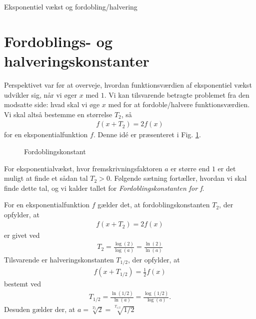 \begin{center}
\Huge
Eksponentiel vækst og fordobling/halvering
\end{center}
\section*{Fordoblings- og halveringskonstanter}
Perspektivet var før at overveje, hvordan funktionsværdien af eksponentiel vækst udvikler sig, når vi øger $x$ med $1$. Vi kan tilsvarende betragte problemet fra den modsatte side: hvad skal vi øge $x$ med for at fordoble/halvere funktionsværdien. Vi skal altså bestemme en størrelse $T_2$, så 
\begin{align*}
f(x+T_2) = 2f(x)
\end{align*}
for en eksponentialfunktion $f$. Denne idé er præsenteret i Fig. \ref{fig:Fordobling}. 
\begin{figure}[H]
\center
{}
\caption{Fordoblingskonstant}
\label{fig:Fordobling}

\end{figure}
For eksponentialvækst, hvor fremskrivningsfaktoren $a$ er større end $1$ er det muligt at finde et sådan tal $T_2>0$. Følgende sætning fortæller, hvordan vi skal finde dette tal, og vi kalder tallet for \textit{Fordoblingskonstanten for f}.
\begin{setn}
For en eksponentialfunktion $f$ gælder det, at fordoblingskonstanten $T_2$, der opfylder, at
\begin{align*}
f(x+T_2) = 2f(x)
\end{align*}
er givet ved 
\begin{align*}
T_2 = \frac{\log(2)}{\log(a)} = \frac{\ln(2)}{\ln(a)}
\end{align*}
Tilsvarende er halveringskonstanten $T_{1/2}$, der opfylder, at 
\begin{align*}
f(x+T_{1/2}) = \frac{1}{2}f(x)
\end{align*}
bestemt ved
\begin{align*}
T_{1/2} = \frac{\ln(1/2)}{\ln(a)} = \frac{\log(1/2)}{\log(a)}.
\end{align*}
Desuden gælder der, at $a = \sqrt[T_2]{2}= \sqrt[T_{1/2}]{1/2}$
\end{setn}
